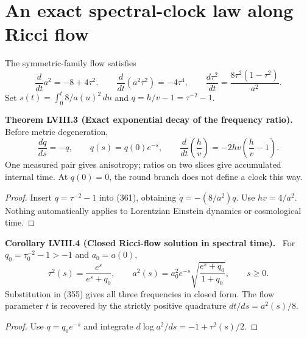 \documentclass[11pt,a4paper,oneside]{book}
\newcommand{\statement}[3]{\par\medskip\noindent\textbf{#1 #2 (#3).}\ }
\begin{document}
\section{An exact spectral-clock law along Ricci flow}
The symmetric-family flow satisfies
\begin{equation}\frac d{dt}a^2=-8+4\tau^2,\qquad\frac d{dt}(a^2\tau^2)=-4\tau^4,\qquad\frac{d\tau^2}{dt}=\frac{8\tau^2(1-\tau^2)}{a^2}.\tag{361}\end{equation}
Set $s(t)=\int_0^t8/a(u)^2\,du$ and $q=h/v-1=\tau^{-2}-1$.
\statement{Theorem}{LVIII.3}{Exact exponential decay of the frequency ratio}
Before metric degeneration,
\begin{equation}\frac{dq}{ds}=-q,\qquad q(s)=q(0)e^{-s},\qquad\frac d{dt}\left(\frac hv\right)=-2hv\left(\frac hv-1\right).\tag{362}\end{equation}
One measured pair gives anisotropy; ratios on two slices give accumulated internal time. At $q(0)=0$, the round branch does not define a clock this way.
\begin{proof}
Insert $q=\tau^{-2}-1$ into (361), obtaining $\dot q=-(8/a^2)q$. Use $hv=4/a^2$. Nothing automatically applies to Lorentzian Einstein dynamics or cosmological time.
\end{proof}
\statement{Corollary}{LVIII.4}{Closed Ricci-flow solution in spectral time}
For $q_0=\tau_0^{-2}-1>-1$ and $a_0=a(0)$,
\begin{equation}\tau^2(s)=\frac{e^s}{e^s+q_0},\qquad a^2(s)=a_0^2e^{-s}\sqrt{\frac{e^s+q_0}{1+q_0}},\qquad s\ge0.\tag{363}\end{equation}
Substitution in (355) gives all three frequencies in closed form. The flow parameter $t$ is recovered by the strictly positive quadrature $dt/ds=a^2(s)/8$.
\begin{proof}
Use $q=q_0e^{-s}$ and integrate $d\log a^2/ds=-1+\tau^2(s)/2$.
\end{proof}
\end{document}
